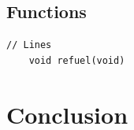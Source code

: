 \documentclass{article}
\begin{document}
\subsection*{Functions}
\begin{lstlisting}[style=CStyle]
	// Lines
	void refuel(void)
\end{lstlisting}

\clearpage

\section{Conclusion}
\end{document}
